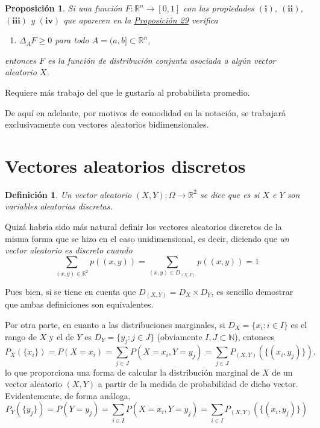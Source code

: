 \documentclass[11pt]{report}
\makeatletter
\renewenvironment{proof}[1][\proofname]{\par
  \pushQED{\qed}%
  \normalfont \topsep\z@skip %
  \trivlist
  \item[\hskip\labelsep
        \itshape
    #1\@addpunct{.}]\ignorespaces
}{%
  \popQED\endtrivlist\@endpefalse
}
\theoremstyle{mytheorem}
\newtheorem{proposition}{Proposición}
\theoremstyle{mydefinition}
\newtheorem{definition}{Definición}
\theoremstyle{myexample}
\let\oldproofname=\proofname
\renewcommand{\proofname}{\rm\bf{\oldproofname}}}
\newenvironment{cdefinition} %
  {\begin{mdframed}[
        linewidth=3pt,
        linecolor=c1,
        bottomline=false,
        topline=false,
        rightline=false,
        innerrightmargin=0pt,
        innertopmargin=0pt,
        innerbottommargin=0pt,
        innerleftmargin=1em,
        skipabove=\baselineskip]
    \begin{definition}}
  {\end{definition}\end{mdframed}}
\newenvironment{cproposition} %
  {\begin{mdframed}[
        linewidth=3pt,
        linecolor=c2,
        bottomline=false,
        topline=false,
        rightline=false,
        innerrightmargin=0pt,
        innertopmargin=0pt,
        innerbottommargin=0pt,
        innerleftmargin=1em,
        skipabove=\baselineskip]
    \begin{proposition}}
  {\end{proposition}\end{mdframed}}
\newcommand{\R}{\mathbb R}
\newcommand{\N}{\mathbb N}
\newcommand{\mybf}[1]{\boldmath\textbf{\color{c1}#1}\unboldmath} %
\makeatother
\begin{document}
\begin{cproposition}
Si una función $F \colon \R^n \to [0,1]$ con las propiedades $(\textbf{i})$, $(\textbf{ii})$, $(\textbf{iii})$ y $(\textbf{iv})$ que aparecen en la \hyperref[prop7.2.]{\color{gray}Proposición 29} verifica
\begin{enumerate}
    \item[\normalfont\textbf{(\textit{v})}] $\Delta_AF \geq 0$ para todo $A = (a,b] \subset \R^n$,
\end{enumerate}
entonces $F$ es la función de distribución conjunta asociada a algún vector aleatorio $X$.
\end{cproposition}

\begin{proof}
Requiere más trabajo del que le gustaría al probabilista promedio.
\end{proof}

De aquí en adelante, por motivos de comodidad en la notación, se trabajará exclusivamente con vectores aleatorios bidimensionales.

\section{Vectores aleatorios discretos}

\begin{cdefinition}
Un vector aleatorio $(X,Y) \colon \Omega \to \R^2$ se dice que es \mybf{{discreto}} si $X$ e $Y$ son variables aleatorias discretas.
\end{cdefinition}

Quizá habría sido más natural definir los vectores aleatorios discretos de la misma forma que se hizo en el caso unidimensional, es decir, diciendo que \textit{un vector aleatorio es discreto cuando}
\[\sum_{(x,y) \in \R^2}p((x,y)) =\sum_{(x,y) \in D_{(X,Y)}}p((x,y))=  1\]

\vspace{-0.5\baselineskip}

Pues bien, si se tiene en cuenta que $D_{(X,Y)} = D_X \times D_Y$, es sencillo demostrar que ambas definiciones son equivalentes.

Por otra parte, en cuanto a las distribuciones marginales, si $D_X = \{x_i \colon i \in I\}$ es el rango de $X$ y el de $Y$ es $D_Y = \{y_j \colon j \in J\}$ (obviamente $I,J \subset \N$), entonces
\[P_X(\{x_i\}) = P(X = x_i) = \sum_{j \in J} P(X=x_i,Y=y_j) = \sum_{j \in J}P_{(X,Y)}(\{(x_i,y_j)\}),\]
lo que proporciona una forma de calcular la distribución marginal de $X$ de un vector aleatorio $(X,Y)$ a partir de la medida de probabilidad de dicho vector. Evidentemente, de forma análoga,
\[P_Y(\{y_j\}) = P(Y = y_j) = \sum_{i \in I} P(X=x_i,Y=y_j) = \sum_{i \in I}P_{(X,Y)}(\{(x_i,y_j)\})\]
\end{document}

